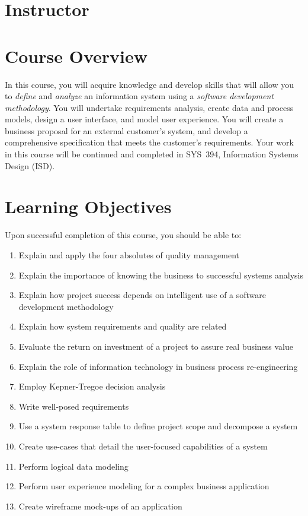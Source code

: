 \documentclass[11pt]{article}
\begin{document}
\section{Instructor}



\section{Course Overview}

In this course, you will acquire knowledge and develop skills
that will allow you to \emph{define} and \emph{analyze} an information system
using a \emph{software development methodology}.
You will
undertake requirements analysis,
create data and process models,
design a user interface,
and model user experience.
You will create a business proposal for an external customer's system,
and develop a comprehensive specification that meets the customer's requirements.
Your work in this course will be continued and completed in
SYS~394, Information Systems Design (ISD).

\section{Learning Objectives}

Upon successful completion of this course, you should be able to:

\begin{enumerate}
\item Explain and apply the four absolutes of quality management
\item Explain the importance of knowing the business to successful systems analysis
\item Explain how project success depends on intelligent use of a software development
  methodology
\item Explain how system requirements and quality are related
\item Evaluate the return on investment of a project to assure real business value
\item Explain the role of information technology in business process re-engineering
\item Employ Kepner-Tregoe decision analysis
\item Write well-posed requirements
\item Use a system response table to define project scope and decompose a system
\item Create use-cases that detail the user-focused capabilities of a system
\item Perform logical data modeling
\item Perform user experience modeling for a complex business application
\item Create wireframe mock-ups of an application
\end{enumerate}
\end{document}
